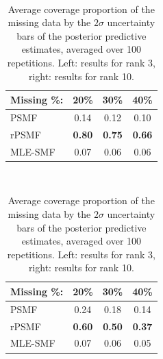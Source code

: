 \documentclass{mldsmsc}
\begin{document}
\begin{table}[H]
    \centering
    \begin{minipage}{0.45\textwidth}
        \centering
         \\[0.5ex]
        \begin{threeparttable}
            \begin{tabular}{lccc}
                \hline
                Missing \%: & 20\% & 30\% & 40\% \\
                \hline
                PSMF & 0.14 & 0.12 & 0.10 \\
                rPSMF & \textbf{0.80} & \textbf{0.75} & \textbf{0.66} \\
                MLE-SMF & 0.07 & 0.06 & 0.06 \\
                \hline
            \end{tabular}
        \end{threeparttable}
    \end{minipage}%
    \hspace{0.1\textwidth}%
    \begin{minipage}{0.45\textwidth}
        \centering
         \\[0.5ex]
        \begin{threeparttable}
            \begin{tabular}{lccc}
                \hline
                Missing \%: & 20\% & 30\% & 40\% \\
                \hline
                PSMF & 0.24 & 0.18 & 0.14 \\
                rPSMF & \textbf{0.60} & \textbf{0.50} & \textbf{0.37} \\
                MLE-SMF & 0.07 & 0.06 & 0.05 \\
                \hline
            \end{tabular}
        \end{threeparttable}
    \end{minipage}
    \caption{Average coverage proportion of the missing data by the $2\sigma$ uncertainty bars of the posterior predictive estimates, averaged over 100 repetitions. Left: results for rank 3, right: results for rank 10.}
    \label{tab:coverage}
\end{table}
\end{document}
